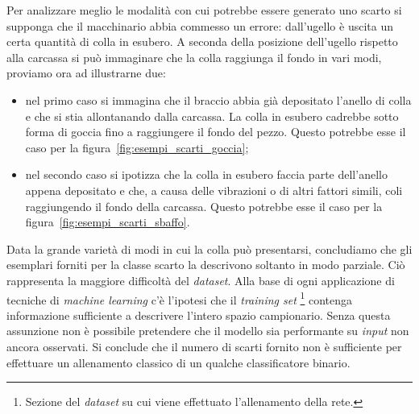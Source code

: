 Per analizzare meglio le modalità con cui potrebbe essere generato uno scarto si supponga che il macchinario abbia commesso un errore: dall'ugello è uscita un certa quantità di colla in esubero.
A seconda della posizione dell'ugello rispetto alla carcassa si può immaginare che la colla raggiunga il fondo in vari modi, proviamo ora ad illustrarne due:
\begin{itemize}
  \item nel primo caso si immagina che il braccio abbia già depositato l'anello di colla e che si stia allontanando dalla carcassa.
    La colla in esubero cadrebbe sotto forma di goccia fino a raggiungere il fondo del pezzo.
    Questo potrebbe esse il caso per la figura~\ref{fig:esempi_scarti_goccia};
  \item nel secondo caso si ipotizza che la colla in esubero faccia parte dell'anello appena depositato e che, a causa delle vibrazioni o di altri fattori simili, coli raggiungendo il fondo della carcassa.
    Questo potrebbe esse il caso per la figura~\ref{fig:esempi_scarti_sbaffo}.
\end{itemize}

Data la grande varietà di modi in cui la colla può presentarsi, concludiamo che gli esemplari forniti per la classe scarto la descrivono soltanto in modo parziale.
Ciò rappresenta la maggiore difficoltà del \textit{dataset}.
Alla base di ogni applicazione di tecniche di \textit{machine learning} c'è l'ipotesi che il \textit{training set} \footnote{Sezione del \textit{dataset} su cui viene effettuato l'allenamento della rete.} contenga informazione sufficiente a descrivere l'intero spazio campionario.
Senza questa assunzione non è possibile pretendere che il modello sia performante su \textit{input} non ancora osservati.
Si conclude che il numero di scarti fornito non è sufficiente per effettuare un allenamento classico di un qualche classificatore binario.

